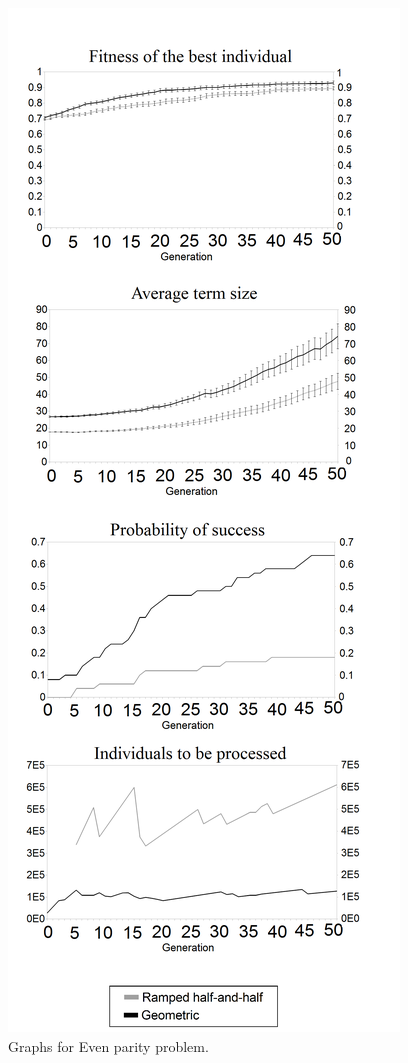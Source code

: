 \documentclass[conference]{IEEEtran}
\begin{document}
\begin{figure}[h!]
  \centering
  \caption{Graphs for Even parity problem.}
  \includegraphics[scale=0.26]{imgs/cec/EPb.PNG}
\end{figure}
\end{document}

